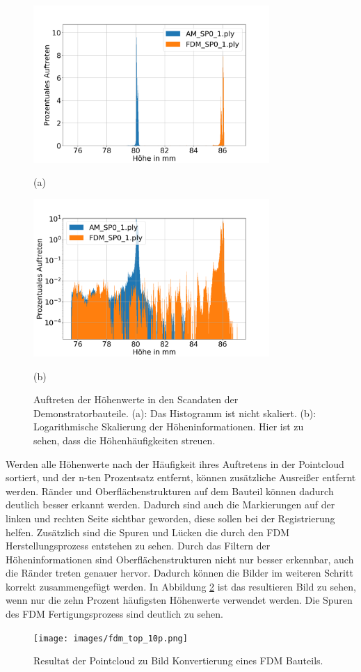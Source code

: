 \begin{figure}[H]
    \centering
    \begin{minipage}{\textwidth}
        \centering
        \includegraphics[width=0.8\textwidth]{images/height_occurange.png} %
        \caption*{(a)}
    \end{minipage}\hfill
    \begin{minipage}{\textwidth}
        \centering
        \includegraphics[width=0.8\textwidth]{images/height_occurange_log.png} %
        \caption*{(b)}
    \end{minipage}
    \caption{Auftreten der Höhenwerte in den Scandaten der Demonstratorbauteile. 
    (a): Das Histogramm ist nicht skaliert. (b): Logarithmische Skalierung der 
    Höheninformationen. Hier ist zu sehen, dass die Höhenhäufigkeiten streuen.}
    \label{fig:brightness}
\end{figure}

Werden alle Höhenwerte nach der Häufigkeit ihres 
Auftretens in der Pointcloud sortiert, und der n-ten Prozentsatz entfernt, können
zusätzliche Ausreißer entfernt werden.
Ränder und Oberflächenstrukturen auf dem Bauteil können dadurch deutlich besser erkannt werden. 
Dadurch sind auch die Markierungen auf der linken und rechten Seite sichtbar geworden,
diese sollen bei der Registrierung
helfen. Zusätzlich sind die Spuren und Lücken die durch den FDM 
Herstellungsprozess entstehen zu sehen.
Durch das Filtern der Höheninformationen sind Oberflächenstrukturen nicht nur besser
erkennbar, auch die Ränder treten genauer hervor. 
Dadurch können die Bilder im weiteren Schritt korrekt zusammengefügt werden.
In Abbildung \ref{fig:10p} ist das resultieren Bild zu sehen, wenn nur die zehn Prozent
häufigsten Höhenwerte verwendet werden.
Die Spuren des FDM Fertigungsprozess sind deutlich zu sehen.

\begin{figure}[H]
    \centering
    \texttt{[image: images/fdm\_top\_10p.png]}
    \caption{Resultat der Pointcloud zu Bild Konvertierung eines FDM Bauteils.}
    \label{fig:10p}
\end{figure}
